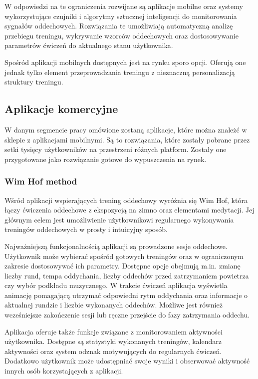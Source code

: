 W odpowiedzi na te ograniczenia rozwijane są aplikacje mobilne oraz systemy wykorzystujące czujniki i algorytmy sztucznej inteligencji do monitorowania sygnałów oddechowych. Rozwiązania te umożliwiają automatyczną analizę przebiegu treningu, wykrywanie wzorców oddechowych oraz dostosowywanie parametrów ćwiczeń do aktualnego stanu użytkownika. 

Spośród aplikacji mobilnych dostępnych jest na rynku sporo opcji. Oferują one jednak tylko element przeprowadzania treningu z nieznaczną personalizacją struktury treningu. 

\newpage

\subsection{Aplikacje komercyjne}
W danym segmencie pracy omówione zostaną aplikacje, które można znależć w sklepie z aplikacjami mobilnymi. Są to rozwiązania, które zostały pobrane przez setki tysięcy użytkowników na przestrzeni różnych platform. Zostały one przygotowane jako rozwiązanie gotowe do wypuszczenia na rynek.
\subsubsection{Wim Hof method}
Wśród aplikacji wspierających trening oddechowy wyróżnia się Wim Hof, która łączy ćwiczenia oddechowe z ekspozycją na zimno oraz elementami medytacji. Jej głównym celem jest umożliwienie użytkownikowi regularnego wykonywania treningów oddechowych w prosty i intuicyjny sposób.

Najważniejszą funkcjonalnością aplikacji są prowadzone sesje oddechowe. Użytkownik może wybierać spośród gotowych treningów oraz w ograniczonym zakresie dostosowywać ich parametry. Dostępne opcje obejmują m.in. zmianę liczby rund, tempa oddychania, liczby oddechów przed zatrzymaniem powietrza czy wybór podkładu muzycznego. W trakcie ćwiczeń aplikacja wyświetla animację pomagającą utrzymać odpowiedni rytm oddychania oraz informacje o aktualnej rundzie i liczbie wykonanych oddechów. Możliwe jest również wcześniejsze zakończenie sesji lub ręczne przejście do fazy zatrzymania oddechu.

Aplikacja oferuje także funkcje związane z monitorowaniem aktywności użytkownika. Dostępne są statystyki wykonanych treningów, kalendarz aktywności oraz system odznak motywujących do regularnych ćwiczeń. Dodatkowo użytkownik może udostępniać swoje wyniki i obserwować aktywność innych osób korzystających z aplikacji.

